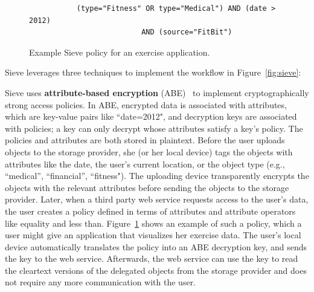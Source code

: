\begin{figure}
\centering
\begin{verbatim}
           (type="Fitness" OR type="Medical") AND (date > 2012) 
                          AND (source="FitBit") 
\end{verbatim}
\caption[Example Sieve policy]{Example Sieve policy for an exercise application.}
\label{fig:policyex}
\end{figure}

Sieve leverages three techniques to implement
the workflow in Figure~\ref{fig:sieve}:\\
\begin{smitemize}
  \item Sieve uses \textbf{attribute-based encryption}
  (ABE)~\cite{kpabe} to implement cryptographically strong access
  policies. In ABE, encrypted data is 
  associated with attributes, which are key-value 
  pairs like ``date=2012", and decryption keys are 
  associated with policies; a key can only
  decrypt whose attributes satisfy a key's
  policy. The policies and attributes are both
  stored in plaintext. Before the user uploads
  objects to the storage provider, she (or her local
  device) tags the objects with attributes like the
  date, the user's current location, or the object type
  (e.g., ``medical'', ``financial'', ``fitness").
  The uploading device transparently encrypts the objects
  with the relevant attributes before sending the objects to
  the storage provider. Later, when a third party web service 
  requests access to the user's data, the user creates a policy
  defined in terms of attributes and attribute
  operators like equality and less than. Figure~\ref{fig:policyex}
  shows an example of such a policy, which a user
  might give an application that visualizes her exercise data.
  The user's local device automatically translates the
  policy into an ABE decryption key, and sends the key
  to the web service. Afterwards, the web service can use
  the key to read the cleartext versions of the delegated
  objects from the storage provider and does not require
  any more communication with the user.
  

\end{smitemize}
